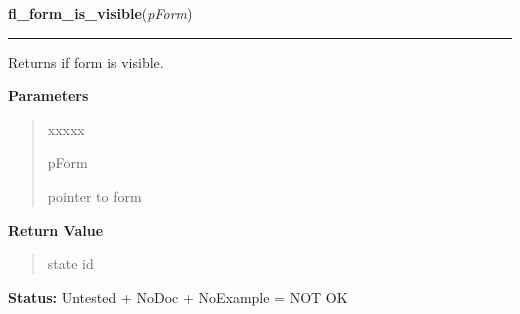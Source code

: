 \hspace{.8\funcindent}\begin{boxedminipage}{\funcwidth}

    \raggedright \textbf{fl\_form\_is\_visible}(\textit{pForm})

    \vspace{-1.5ex}

    \rule{\textwidth}{0.5\fboxrule}
\setlength{\parskip}{2ex}
    Returns if form is visible.

\setlength{\parskip}{1ex}
      \textbf{Parameters}
      \vspace{-1ex}

      \begin{quote}
        \begin{Ventry}{xxxxx}

          \item[pForm]

          pointer to form

        \end{Ventry}

      \end{quote}

      \textbf{Return Value}
    \vspace{-1ex}

      \begin{quote}
      state id

      \end{quote}

\textbf{Status:} Untested + NoDoc + NoExample = NOT OK



    \end{boxedminipage}

    \label{xformslib:library:fl_form_is_iconified}

    \vspace{0.5ex}

